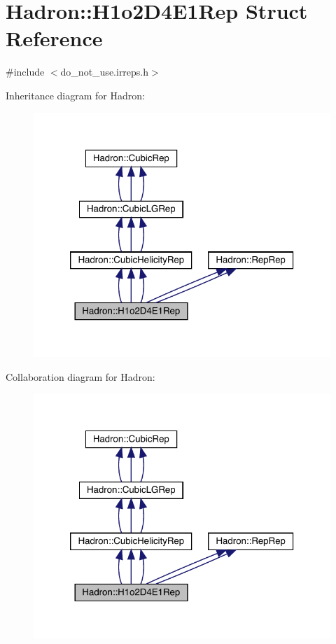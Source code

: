 \hypertarget{structHadron_1_1H1o2D4E1Rep}{}\section{Hadron\+:\+:H1o2\+D4\+E1\+Rep Struct Reference}
\label{structHadron_1_1H1o2D4E1Rep}


{\ttfamily \#include $<$do\+\_\+not\+\_\+use.\+irreps.\+h$>$}



Inheritance diagram for Hadron\+:
\nopagebreak
\begin{figure}[H]
\begin{center}
\leavevmode
\includegraphics[width=320pt]{d6/d1e/structHadron_1_1H1o2D4E1Rep__inherit__graph}
\end{center}
\end{figure}


Collaboration diagram for Hadron\+:
\nopagebreak
\begin{figure}[H]
\begin{center}
\leavevmode
\includegraphics[width=320pt]{dc/d3e/structHadron_1_1H1o2D4E1Rep__coll__graph}
\end{center}
\end{figure}
